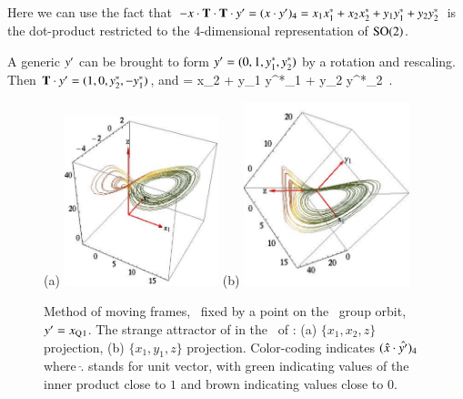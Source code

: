 Here we can use the fact that
$- x \cdot \mathbf{T}\cdot\mathbf{T} \cdot {\ensuremath{y'}}
 = (x \cdot {\ensuremath{y'}} )_4 =
    x_1 x_1^{*}
   +x_2 x_2^{*}
   +y_1 y_1^{*}
   +y_2 y_2^{*}
$
is the dot-product restricted to the 4-dimensional
representation of $\textrm{SO}(2)$.

A generic  $ {y'} $ can be brought to form $ {y'}  =
(0,1,y_1^{*},y_2^{*})$ by a rotation and rescaling. Then $\mathbf{T}
\cdot {\ensuremath{y'}}   = (1,0,y_2^{*},-y_1^{*})$, and
\beq
{} =
     {x_2 + y_1 y^{*}_1 + y_2 y^{*}_2}
\,.
\label{PCsectSin}
\eeq

%
\begin{figure}[ht]
\begin{center}
(a) \includegraphics[width=0.40\textwidth]{../figs/CLEpcSect}
(b) \includegraphics[width=0.43\textwidth]{../figs/CLEpcSect2}
\end{center}
\caption{
Method of moving frames, \slice\ fixed by a point on the
\reqv\ group orbit, ${y'}  = x_{\mathrm{Q}_{}1}$. The strange
attractor of  in the \reducedsp\
of :
(a) $\{x_1,x_2,z\}$ projection,
(b) $\{x_1,y_1,z\}$ projection.
Color-coding indicates $(\hat{x} \cdot \hat{{y'} })_4$
where $\hat{.}$ stands for unit vector, with green indicating values
of the inner product close to $1$ and brown indicating values
close to $0$.
}
\label{fig:CLEpcSect}
\end{figure}
